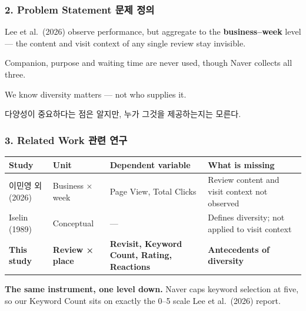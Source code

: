 \documentclass[compress]{beamer}
\newcommand{\ko}[1]{{\footnotesize\color{black!50}#1}}
\newcommand{\kosub}[1]{{\scriptsize\color{black!55}#1}}
\newcommand{\aside}[1]{%
  \begin{center}\colorbox{UBIblue!12}{%
    \parbox{\dimexpr\textwidth-14pt\relax}{\vspace{2pt}#1\vspace{2pt}}}\end{center}}
\begin{document}
\begin{frame}
\frametitle{2. Problem Statement \ko{문제 정의}}
\aside{\small
  Lee et al.\ (2026) observe performance, but aggregate to the
  \textbf{business--week} level — the content and visit context of any single
  review stay invisible.\par\vspace{5pt}
  Companion, purpose and waiting time are never used, though Naver collects all
  three.\par\vspace{5pt}
  {\color{UBIred}We know diversity matters — not who supplies it.}}
\vspace{4pt}
\kosub{다양성이 중요하다는 점은 알지만, 누가 그것을 제공하는지는 모른다.}
\end{frame}

\begin{frame}
\frametitle{3. Related Work \ko{관련 연구}}
\begin{center}
{\scriptsize\color{black}
\begin{tabular}{@{}p{2.0cm}p{1.8cm}p{2.4cm}p{3.0cm}@{}}
  \toprule
  \textbf{Study} & \textbf{Unit} & \textbf{Dependent variable} &
  \textbf{What is missing} \\
  \midrule
  이민영 외 (2026) & Business × week & Page View, Total Clicks &
    Review content and visit context not observed \\[4pt]
  Iselin (1989) & Conceptual & — &
    Defines diversity; not applied to visit context \\[4pt]
  \textcolor{UBIred}{\textbf{This study}} & \textbf{Review × place} &
    \textbf{Revisit, Keyword Count, Rating, Reactions} &
    \textbf{Antecedents of diversity} \\
  \bottomrule
\end{tabular}}
\end{center}
\aside{\scriptsize
  {\color{UBIred}\textbf{The same instrument, one level down.}}
  Naver caps keyword selection at five, so our Keyword Count sits on exactly the
  0--5 scale Lee et al.\ (2026) report.}
\end{frame}
\end{document}
